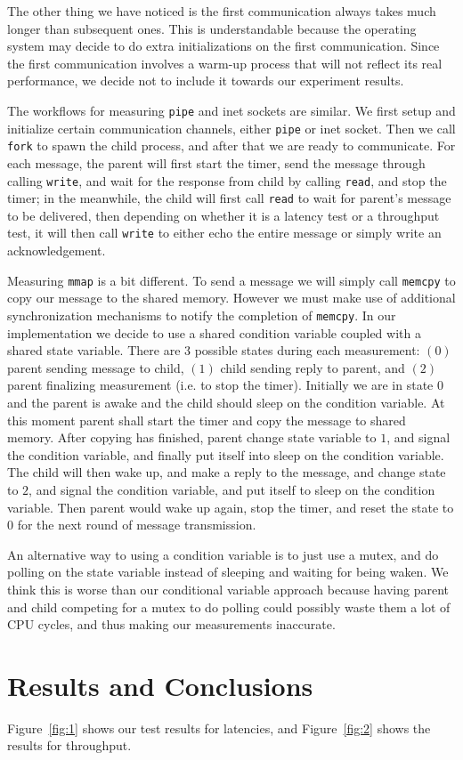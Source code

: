 \documentclass{article}
\begin{document}
The other thing we have noticed is the first communication always takes much longer than subsequent ones.
This is understandable because the operating system may decide to do extra initializations on the first communication.
Since the first communication involves a warm-up process that will not reflect its real performance, we decide not to include it towards our experiment results.

The workflows for measuring \texttt{pipe} and inet sockets are similar.
We first setup and initialize certain communication channels, either \texttt{pipe} or inet socket.
Then we call \texttt{fork} to spawn the child process, and after that we are ready to communicate.
For each message, the parent will first start the timer, send the message through calling \texttt{write}, and wait for the response from child by calling \texttt{read}, and stop the timer; in the meanwhile, the child will first call \texttt{read} to wait for parent's message to be delivered, then depending on whether it is a latency test or a throughput test, it will then call \texttt{write} to either echo the entire message or simply write an acknowledgement.

Measuring \texttt{mmap} is a bit different.
To send a message we will simply call \texttt{memcpy} to copy our message to the shared memory.
However we must make use of additional synchronization mechanisms to notify the completion of \texttt{memcpy}.
In our implementation we decide to use a shared condition variable coupled with a shared state variable.
There are $3$ possible states during each measurement: $(0)$ parent sending message to child, $(1)$ child sending reply to parent, and $(2)$ parent finalizing measurement (i.e. to stop the timer).
Initially we are in state $0$ and the parent is awake and the child should sleep on the condition variable.
At this moment parent shall start the timer and copy the message to shared memory.
After copying has finished, parent change state variable to $1$, and signal the condition variable, and finally put itself into sleep on the condition variable.
The child will then wake up, and make a reply to the message, and change state to $2$, and signal the condition variable, and put itself to sleep on the condition variable.
Then parent would wake up again, stop the timer, and reset the state to $0$ for the next round of message transmission.

An alternative way to using a condition variable is to just use a mutex, and do polling on the state variable instead of sleeping and waiting for being waken.
We think this is worse than our conditional variable approach because having parent and child competing for a mutex to do polling could possibly waste them a lot of CPU cycles, and thus making our measurements inaccurate.

\section{Results and Conclusions}
\label{sec:results}
Figure~\ref{fig:1} shows our test results for latencies, and Figure~\ref{fig:2} shows the results for throughput.
\end{document}
